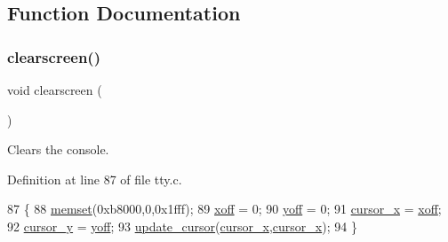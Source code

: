\subsection{Function Documentation}
\mbox{\label{a00182_aff4bc17c602603d120756f52e18ebb96_aff4bc17c602603d120756f52e18ebb96}} 
\subsubsection{\texorpdfstring{clearscreen()}{clearscreen()}}
{\footnotesize\ttfamily void clearscreen (\begin{DoxyParamCaption}{ }\end{DoxyParamCaption})}



Clears the console. 



Definition at line 87 of file tty.\+c.


\begin{DoxyCode}
87                    \{
88     \hyperlink{a00131_a9e432f267691eceb2e2e0efcc37efbc9_a9e432f267691eceb2e2e0efcc37efbc9}{memset}(0xb8000,0,0x1fff);
89     \hyperlink{a00179_abaa0d20f0e52ce0d3a7d706f6ac16266_abaa0d20f0e52ce0d3a7d706f6ac16266}{xoff} = 0;
90     \hyperlink{a00179_a1a7539764d0ae8cd06ce45c62cf92bca_a1a7539764d0ae8cd06ce45c62cf92bca}{yoff} = 0;
91     \hyperlink{a00179_ae69604af0f9bd5fca2a016d0aa1ba7e1_ae69604af0f9bd5fca2a016d0aa1ba7e1}{cursor\_x} = \hyperlink{a00179_abaa0d20f0e52ce0d3a7d706f6ac16266_abaa0d20f0e52ce0d3a7d706f6ac16266}{xoff};
92     \hyperlink{a00179_a0301c5492919c401c2c1ecf52af709b0_a0301c5492919c401c2c1ecf52af709b0}{cursor\_y} = \hyperlink{a00179_a1a7539764d0ae8cd06ce45c62cf92bca_a1a7539764d0ae8cd06ce45c62cf92bca}{yoff};
93     \hyperlink{a00179_a492f5021d7340613e732ef37bbaa04e4_a492f5021d7340613e732ef37bbaa04e4}{update\_cursor}(\hyperlink{a00179_ae69604af0f9bd5fca2a016d0aa1ba7e1_ae69604af0f9bd5fca2a016d0aa1ba7e1}{cursor\_x},\hyperlink{a00179_ae69604af0f9bd5fca2a016d0aa1ba7e1_ae69604af0f9bd5fca2a016d0aa1ba7e1}{cursor\_x});
94 \}
\end{DoxyCode}
\mbox{\label{a00182_a3d09038c7b6436e60b228f2f3f451f6a_a3d09038c7b6436e60b228f2f3f451f6a}} 

